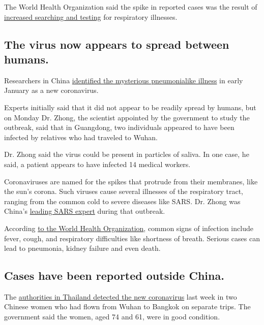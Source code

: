 The World Health Organization said the spike in reported cases was the
result of
\href{https://twitter.com/WHO/status/1219026530636091392}{increased
searching and testing} for respiratory illnesses.

\hypertarget{the-virus-now-appears-to-spread-between-humans}{%
\subsection{The virus now appears to spread between
humans.}\label{the-virus-now-appears-to-spread-between-humans}}

Researchers in China
\href{https://www.nytimes.com/2020/01/08/health/china-pneumonia-outbreak-virus.html}{identified
the mysterious pneumonialike illness} in early January as a new
coronavirus.

Experts initially said that it did not appear to be readily spread by
humans, but on Monday Dr. Zhong, the scientist appointed by the
government to study the outbreak, said that in Guangdong, two
individuals appeared to have been infected by relatives who had traveled
to Wuhan.

Dr. Zhong said the virus could be present in particles of saliva. In one
case, he said, a patient appears to have infected 14 medical workers.

Coronaviruses are named for the spikes that protrude from their
membranes, like the sun's corona. Such viruses cause several illnesses
of the respiratory tract, ranging from the common cold to severe
diseases like SARS. Dr. Zhong was China's
\href{https://www.nytimes.com/2005/05/15/health/after-its-epidemic-arrival-sars-vanishes.html}{leading
SARS expert} during that outbreak.

According \href{https://www.who.int/health-topics/coronavirus}{to the
World Health Organization}, common signs of infection include fever,
cough, and respiratory difficulties like shortness of breath. Serious
cases can lead to pneumonia, kidney failure and even death.

\hypertarget{cases-have-been-reported-outside-china}{%
\subsection{Cases have been reported outside
China.}\label{cases-have-been-reported-outside-china}}

The
\href{https://www.nytimes.com/2020/01/15/world/asia/coronavirus-japan-china.html}{authorities
in Thailand detected the new coronavirus} last week in two Chinese women
who had flown from Wuhan to Bangkok on separate trips. The government
said the women, aged 74 and 61, were in good condition.

